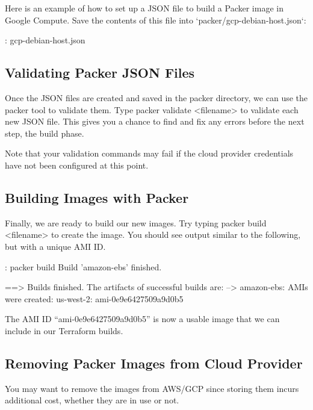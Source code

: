 \justifying
Here is an example of how to set up a JSON file to build a Packer image
in Google Compute. Save the contents of this file into `packer/gcp-debian-host.json`:

\justifying
\begin{mybox}{\thetcbcounter: gcp-debian-host.json}
	
\end{mybox}


\subsection{Validating Packer JSON Files}

\justifying
Once the JSON files are created and saved in the packer directory, we
can use the packer tool to validate them. Type packer validate \textless{}filename\textgreater{} to validate each new
JSON file. This gives you a chance to find and fix any errors before the next step, the build phase.

\justifying
Note that your validation commands may fail if the cloud provider
credentials have not been configured at this point.

\subsection{Building Images with Packer}

\justifying
Finally, we are ready to build our new images. Try typing
packer build \textless{}filename\textgreater{} to create the image. You
should see output similar to the following, but with a unique AMI ID.

\begin{mybox}{\thetcbcounter: packer build}
Build 'amazon-ebs' finished.

==> Builds finished. The artifacts of successful builds are:
--> amazon-ebs: AMIs were created:
    us-west-2: ami-0e9e6427509a9d0b5
\end{mybox}

\justifying
The AMI ID ``ami-0e9e6427509a9d0b5'' is now a usable image that we can
include in our Terraform builds.

\subsection{Removing Packer Images from Cloud Provider}

\justifying
You may want to remove the images from AWS/GCP since storing them incurs
additional cost, whether they are in use or not.

